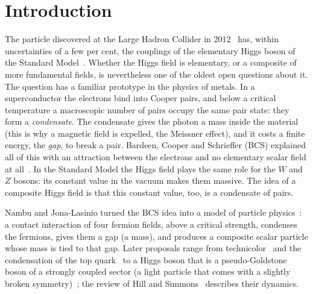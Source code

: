 \documentclass[aps,prd,twocolumn,superscriptaddress,nofootinbib,floatfix,longbibliography]{revtex4-2}
\begin{document}
\maketitle

\section{Introduction}
\label{sec:intro}

The particle discovered at the Large Hadron Collider in 2012~\cite{ATLAS2012,CMS2012} has, within uncertainties of a few
per cent, the couplings of the elementary Higgs boson of the Standard Model~\cite{ATLAS2022,CMS2022}. Whether the Higgs
field is elementary, or a composite of more fundamental fields, is nevertheless one of the oldest open questions about
it. The question has a familiar prototype in the physics of metals. In a superconductor the electrons bind into Cooper
pairs, and below a critical temperature a macroscopic number of pairs occupy the same pair state: they form a
\emph{condensate}. The condensate gives the photon a mass inside the material (this is why a magnetic field is expelled,
the Meissner effect), and it costs a finite energy, the \emph{gap}, to break a pair. Bardeen, Cooper and Schrieffer (BCS)
explained all of this with an attraction between the electrons and no elementary scalar field at all~\cite{BCS1957}.
In the Standard Model the Higgs field plays the same role for the $W$ and $Z$ bosons: its constant value in the vacuum
makes them massive. The idea of a composite Higgs field is that this constant value, too, is a condensate of pairs.

Nambu and Jona-Lasinio turned the BCS idea into a model of particle physics~\cite{NJL1961}: a contact interaction of
four fermion fields, above a critical strength, condenses the fermions, gives them a gap (a mass), and produces a
composite scalar particle whose mass is tied to that gap. Later proposals range from technicolor~\cite{Weinberg1976,
Susskind1979} and the condensation of the top quark~\cite{Miransky1989,BHL1990} to a Higgs boson that is a
pseudo-Goldstone boson of a strongly coupled sector (a light particle that comes with a slightly broken
symmetry)~\cite{KaplanGeorgi1984,Agashe2005}; the review of Hill and
Simmons~\cite{HillSimmons2003} describes their dynamics.
\end{document}
